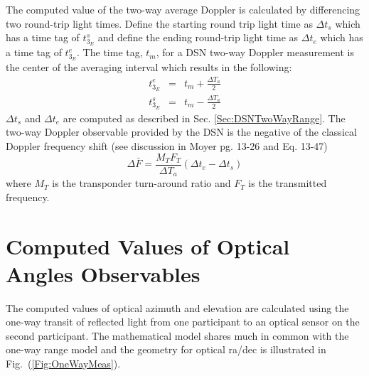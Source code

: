 The computed value of the two-way average Doppler is calculated by differencing two round-trip light times.   Define the starting round trip light time as $\Delta t_s$ which has a time tag of $t_{3_E}^s$ and define the ending round-trip light time as $\Delta t_e$ which has a time tag of $t_{3_E}^e$.  The time tag, $t_m$, for a DSN two-way Doppler measurement is the center of the averaging interval which results in the following:
%
\begin{eqnarray}
   t_{3_E}^e &=& t_m +\frac{\Delta T_a}{2}\\
   t_{3_E}^s &=& t_m -\frac{\Delta T_a}{2}
\end{eqnarray}
%
$\Delta t_s$ and $\Delta t_e$ are computed as described in Sec. \ref{Sec:DSNTwoWayRange}. The two-way Doppler observable provided by the DSN is the negative of the classical Doppler frequency shift (see discussion in Moyer \cite{Moyer}  pg. 13-26 and Eq. 13-47)
%
\begin{equation}
   \Delta \bar{F} = \frac{M_T F_T}{\Delta T_a} \left(\Delta t_e - \Delta t_s  \right)
\end{equation}
%
where $M_T$ is the transponder turn-around ratio and $F_T$ is the transmitted frequency.

\section{Computed Values of Optical Angles Observables}

The computed values of optical azimuth and elevation are calculated using the one-way transit of
reflected light from one participant to an optical sensor on the second participant.  The mathematical model shares
much in common with the one-way range model and the geometry for optical ra/dec is illustrated in
Fig.~(\ref{Fig:OneWayMeas}).

